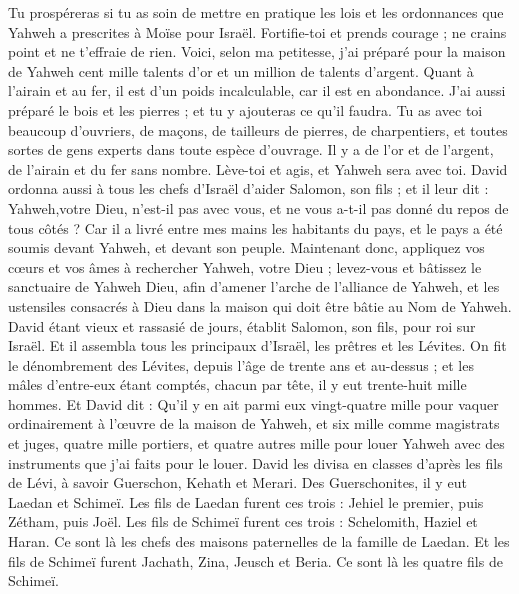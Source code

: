 \begin{multicols}{2}
Tu prospéreras si tu as soin de mettre en pratique les lois et les ordonnances que Yahweh a prescrites à Moïse pour Israël. Fortifie-toi et prends courage ; ne crains point et ne t'effraie de rien.
Voici, selon ma petitesse, j'ai préparé pour la maison de Yahweh cent mille talents d'or et un million de talents d'argent. Quant à l'airain et au fer, il est d'un poids incalculable, car il est en abondance. J'ai aussi préparé le bois et les pierres ; et tu y ajouteras ce qu'il faudra.
Tu as avec toi beaucoup d'ouvriers, de maçons, de tailleurs de pierres, de charpentiers, et toutes sortes de gens experts dans toute espèce d'ouvrage.
Il y a de l'or et de l'argent, de l'airain et du fer sans nombre. Lève-toi et agis, et Yahweh sera avec toi.
David ordonna aussi à tous les chefs d'Israël d'aider Salomon, son fils ; et il leur dit :
Yahweh,votre Dieu, n'est-il pas avec vous, et ne vous a-t-il pas donné du repos de tous côtés ? Car il a livré entre mes mains les habitants du pays, et le pays a été soumis devant Yahweh, et devant son peuple.
Maintenant donc, appliquez vos cœurs et vos âmes à rechercher Yahweh, votre Dieu ; levez-vous et bâtissez le sanctuaire de Yahweh Dieu, afin d'amener l'arche de l'alliance de Yahweh, et les ustensiles consacrés à Dieu dans la maison qui doit être bâtie au Nom de Yahweh.
\VerseOne{}David étant vieux et rassasié de jours, établit Salomon, son fils, pour roi sur Israël.
Et il assembla tous les principaux d'Israël, les prêtres et les Lévites.
On fit le dénombrement des Lévites, depuis l'âge de trente ans et au-dessus ; et les mâles d'entre-eux étant comptés, chacun par tête, il y eut trente-huit mille hommes.
Et David dit : Qu'il y en ait parmi eux vingt-quatre mille pour vaquer ordinairement à l'œuvre de la maison de Yahweh, et six mille comme magistrats et juges,
quatre mille portiers, et quatre autres mille pour louer Yahweh avec des instruments que j'ai faits pour le louer.
David les divisa en classes d'après les fils de Lévi, à savoir Guerschon, Kehath et Merari.
Des Guerschonites, il y eut Laedan et Schimeï.
Les fils de Laedan furent ces trois : Jehiel le premier, puis Zétham, puis Joël.
Les fils de Schimeï furent ces trois : Schelomith, Haziel et Haran. Ce sont là les chefs des maisons paternelles de la famille de Laedan.
Et les fils de Schimeï furent Jachath, Zina, Jeusch et Beria. Ce sont là les quatre fils de Schimeï.

\end{multicols}
